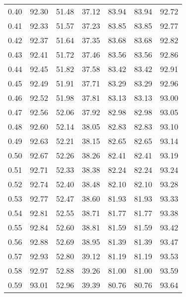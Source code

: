 \begin{tabular}{|c|c|c|c|c|c|c|}
      0.40 &     92.30 &     51.48 &      37.12 &   83.94 &      83.94 &         92.72 \\
      0.41 &     92.33 &     51.57 &      37.23 &   83.85 &      83.85 &         92.77 \\
      0.42 &     92.37 &     51.64 &      37.35 &   83.68 &      83.68 &         92.82 \\
      0.43 &     92.41 &     51.72 &      37.46 &   83.56 &      83.56 &         92.86 \\
      0.44 &     92.45 &     51.82 &      37.58 &   83.42 &      83.42 &         92.91 \\
      0.45 &     92.49 &     51.91 &      37.71 &   83.29 &      83.29 &         92.96 \\
      0.46 &     92.52 &     51.98 &      37.81 &   83.13 &      83.13 &         93.00 \\
      0.47 &     92.56 &     52.06 &      37.92 &   82.98 &      82.98 &         93.05 \\
      0.48 &     92.60 &     52.14 &      38.05 &   82.83 &      82.83 &         93.10 \\
      0.49 &     92.63 &     52.21 &      38.15 &   82.65 &      82.65 &         93.14 \\
      0.50 &     92.67 &     52.26 &      38.26 &   82.41 &      82.41 &         93.19 \\
      0.51 &     92.71 &     52.33 &      38.38 &   82.24 &      82.24 &         93.24 \\
      0.52 &     92.74 &     52.40 &      38.48 &   82.10 &      82.10 &         93.28 \\
      0.53 &     92.77 &     52.47 &      38.60 &   81.93 &      81.93 &         93.33 \\
      0.54 &     92.81 &     52.55 &      38.71 &   81.77 &      81.77 &         93.38 \\
      0.55 &     92.84 &     52.60 &      38.81 &   81.59 &      81.59 &         93.42 \\
      0.56 &     92.88 &     52.69 &      38.95 &   81.39 &      81.39 &         93.47 \\
      0.57 &     92.93 &     52.80 &      39.12 &   81.19 &      81.19 &         93.53 \\
      0.58 &     92.97 &     52.88 &      39.26 &   81.00 &      81.00 &         93.59 \\
      0.59 &     93.01 &     52.96 &      39.39 &   80.76 &      80.76 &         93.64 \\

\end{tabular}
